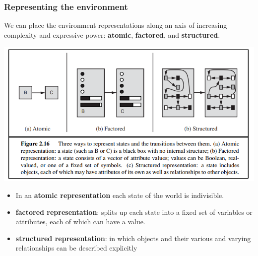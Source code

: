 \subsubsection{Representing the environment}
We can place the environment representations along an axis of increasing complexity and expressive power: \textbf{atomic}, \textbf{factored}, and \textbf{structured}.
\begin{center}
    \includegraphics[]{images/environment repr.png}
\end{center}
\begin{itemize}
    \item In an \textbf{atomic representation} each state of the world is indivisible.

    \item \textbf{factored representation}: splits up each state into a fixed set of variables or attributes, each of which can have a value.

    \item \textbf{structured representation}: in which objects and their various and varying relationships can be described explicitly
\end{itemize}
